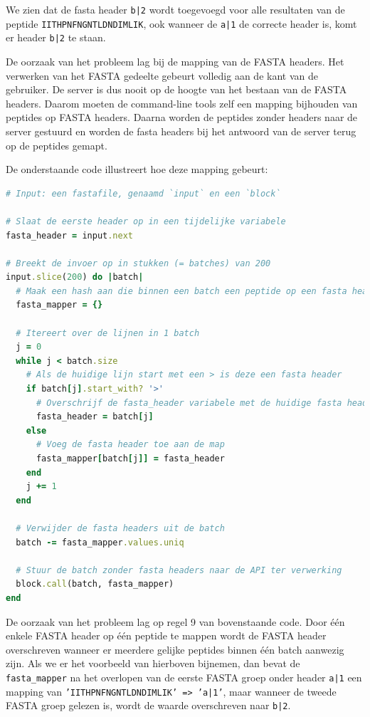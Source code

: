 We zien dat de fasta header \texttt{b|2} wordt toegevoegd voor alle resultaten 
van de peptide \texttt{IITHPNFNGNTLDNDIMLIK}, ook wanneer de \texttt{a|1} de 
correcte header is, komt er header \texttt{b|2} te staan.

De oorzaak van het probleem lag bij de mapping van de FASTA headers. Het 
verwerken van het FASTA gedeelte gebeurt volledig aan de kant van de gebruiker. 
De server is dus nooit op de hoogte van het bestaan van de 
FASTA headers. Daarom 
moeten de command-line tools zelf een mapping bijhouden van peptides op FASTA 
headers. Daarna worden de peptides zonder headers naar de server gestuurd en 
worden de fasta headers bij het antwoord van de server terug op de peptides 
gemapt.

De onderstaande code illustreert hoe deze mapping gebeurt:

\begin{lstlisting}[language=Ruby]
# Input: een fastafile, genaamd `input` en een `block`

# Slaat de eerste header op in een tijdelijke variabele
fasta_header = input.next

# Breekt de invoer op in stukken (= batches) van 200
input.slice(200) do |batch|
  # Maak een hash aan die binnen een batch een peptide op een fasta header mapt
  fasta_mapper = {}
  
  # Itereert over de lijnen in 1 batch
  j = 0
  while j < batch.size
    # Als de huidige lijn start met een > is deze een fasta header
    if batch[j].start_with? '>'
      # Overschrijf de fasta_header variabele met de huidige fasta header
      fasta_header = batch[j]
    else
      # Voeg de fasta header toe aan de map
      fasta_mapper[batch[j]] = fasta_header
    end
    j += 1
  end
  
  # Verwijder de fasta headers uit de batch
  batch -= fasta_mapper.values.uniq
  
  # Stuur de batch zonder fasta headers naar de API ter verwerking
  block.call(batch, fasta_mapper)
end
\end{lstlisting}

De oorzaak van het probleem lag op regel 9 van bovenstaande code. Door één
enkele FASTA header op één peptide te mappen wordt de FASTA header overschreven
wanneer er meerdere gelijke peptides binnen één batch aanwezig zijn. Als we er
het voorbeeld van hierboven bijnemen, dan bevat de \texttt{fasta\_mapper} na 
het
overlopen van de eerste FASTA groep onder header \texttt{a|1} een mapping van
\texttt{'IITHPNFNGNTLDNDIMLIK' => 'a|1'}, maar wanneer de tweede FASTA groep
gelezen is, wordt de waarde overschreven naar \texttt{b|2}.


